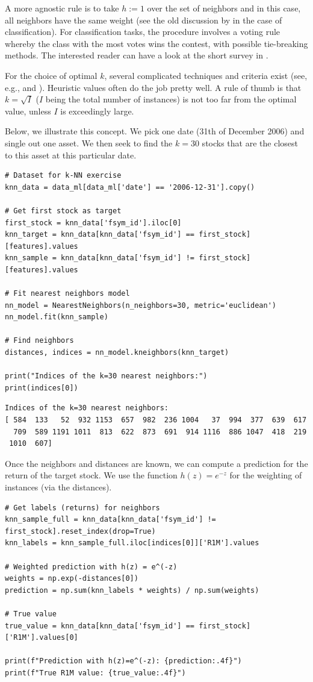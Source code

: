 A more agnostic rule is to take $h:=1$ over the set of neighbors and in this case, all neighbors have the same weight (see the old discussion by \cite{bailey1978note} in the case of classification). For classification tasks, the procedure involves a voting rule whereby the class with the most votes wins the contest, with possible tie-breaking methods. The interested reader can have a look at the short survey in \cite{bhatia2010survey}.

For the choice of optimal $k$, several complicated techniques and criteria exist (see, e.g., \cite{ghosh2006optimum} and \cite{hall2008choice}). Heuristic values often do the job pretty well. A rule of thumb is that $k=\sqrt{I}$ ($I$ being the total number of instances) is not too far from the optimal value, unless $I$ is exceedingly large.

Below, we illustrate this concept. We pick one date (31th of December 2006) and single out one asset. We then seek to find the $k=30$ stocks that are the closest to this asset at this particular date.

\begin{verbatim}
# Dataset for k-NN exercise
knn_data = data_ml[data_ml['date'] == '2006-12-31'].copy()

# Get first stock as target
first_stock = knn_data['fsym_id'].iloc[0]
knn_target = knn_data[knn_data['fsym_id'] == first_stock][features].values
knn_sample = knn_data[knn_data['fsym_id'] != first_stock][features].values

# Fit nearest neighbors model
nn_model = NearestNeighbors(n_neighbors=30, metric='euclidean')
nn_model.fit(knn_sample)

# Find neighbors
distances, indices = nn_model.kneighbors(knn_target)

print("Indices of the k=30 nearest neighbors:")
print(indices[0])
\end{verbatim}

\begin{verbatim}
Indices of the k=30 nearest neighbors:
[ 584  133   52  932 1153  657  982  236 1004   37  994  377  639  617
  709  589 1191 1011  813  622  873  691  914 1116  886 1047  418  219
 1010  607]
\end{verbatim}

Once the neighbors and distances are known, we can compute a prediction for the return of the target stock. We use the function $h(z)=e^{ -z}$ for the weighting of instances (via the distances).

\begin{verbatim}
# Get labels (returns) for neighbors
knn_sample_full = knn_data[knn_data['fsym_id'] != first_stock].reset_index(drop=True)
knn_labels = knn_sample_full.iloc[indices[0]]['R1M'].values

# Weighted prediction with h(z) = e^(-z)
weights = np.exp(-distances[0])
prediction = np.sum(knn_labels * weights) / np.sum(weights)

# True value
true_value = knn_data[knn_data['fsym_id'] == first_stock]['R1M'].values[0]

print(f"Prediction with h(z)=e^(-z): {prediction:.4f}")
print(f"True R1M value: {true_value:.4f}")
\end{verbatim}

